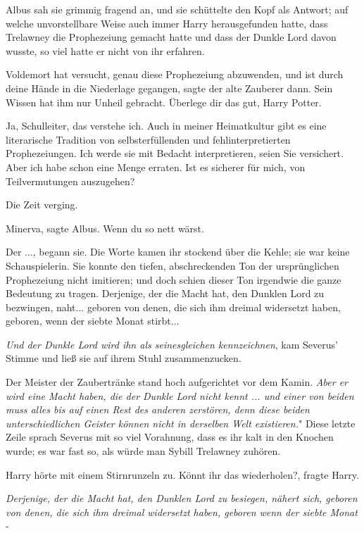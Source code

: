Albus sah sie grimmig fragend an, und sie schüttelte den Kopf als Antwort; auf
welche unvorstellbare Weise auch immer Harry herausgefunden hatte, dass
Trelawney die Prophezeiung gemacht hatte und dass der Dunkle Lord davon wusste,
so viel hatte er nicht von ihr erfahren.

\glqq Voldemort hat versucht, genau diese Prophezeiung abzuwenden, und ist durch
deine Hände in die Niederlage gegangen\grqq{}, sagte der alte Zauberer dann.
\glqq Sein Wissen hat ihm nur Unheil gebracht. Überlege dir das gut, Harry
Potter.\grqq{}

\glqq Ja, Schulleiter, das verstehe ich. Auch in meiner Heimatkultur gibt es
eine literarische Tradition von selbsterfüllenden und fehlinterpretierten
Prophezeiungen. Ich werde sie mit Bedacht interpretieren, seien Sie versichert.
Aber ich habe schon eine Menge erraten. Ist es sicherer für mich, von
Teilvermutungen auszugehen?\grqq{}

Die Zeit verging.

\glqq Minerva\grqq{}, sagte Albus. \glqq Wenn du so nett wärst.\grqq{}

\glqq Der ...\grqq{}, begann sie. Die Worte kamen ihr stockend über die Kehle;
sie war keine Schauspielerin. Sie konnte den tiefen, abschreckenden Ton der
ursprünglichen Prophezeiung nicht imitieren; und doch schien dieser Ton
irgendwie die ganze Bedeutung zu tragen. \glqq Derjenige, der die Macht hat, den
Dunklen Lord zu bezwingen, naht... geboren von denen, die sich ihm dreimal
widersetzt haben, geboren, wenn der siebte Monat stirbt...\grqq{}

\glqq \emph{Und der Dunkle Lord wird ihn als seinesgleichen
kennzeichnen}\grqq{}, kam Severus' Stimme und ließ sie auf ihrem Stuhl
zusammenzucken.

Der Meister der Zaubertränke stand hoch aufgerichtet vor dem Kamin. \glqq
\emph{Aber er wird eine Macht haben, die der Dunkle Lord nicht kennt ... und
einer von beiden muss alles bis auf einen Rest des anderen zerstören, denn diese
beiden unterschiedlichen Geister können nicht in derselben Welt existieren.}"
Diese letzte Zeile sprach Severus mit so viel Vorahnung, dass es ihr kalt in den
Knochen wurde; es war fast so, als würde man Sybill Trelawney zuhören.

Harry hörte mit einem Stirnrunzeln zu. \glqq Könnt ihr das wiederholen?\grqq{},
fragte Harry.

\glqq \emph{Derjenige, der die Macht hat, den Dunklen Lord zu besiegen, nähert
sich, geboren von denen, die sich ihm dreimal widersetzt haben, geboren wenn der
siebte Monat} -\grqq{}

